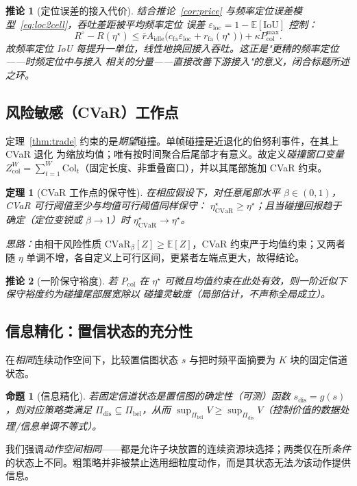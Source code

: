 \documentclass[11pt,a4paper]{article}
\theoremstyle{plain}
\newtheorem{theorem}{定理}
\newtheorem{proposition}{命题}
\newtheorem{corollary}{推论}
\theoremstyle{definition}
\newcommand{\Pcol}{P_{\mathrm{col}}}
\newcommand{\thr}{\eta}
\newcommand{\eloc}{\varepsilon_{\mathrm{loc}}}
\newcommand{\CVaR}{\mathrm{CVaR}}
\newcommand{\E}{\mathbb{E}}
\begin{document}
\begin{corollary}[定位误差的接入代价]
\label{cor:loc}
结合推论~\ref{cor:price} 与频率定位误差模型~\eqref{eq:loc2cell}，吞吐差距被平均频率定位
误差 $\eloc=1-\E[\mathrm{IoU}]$ 控制：
\[
R^\circ-R(\thr^\star)\le \bar r A_{\mathrm{idle}}\big(c_{\mathrm{fa}}\eloc+r_{\mathrm{fa}}(\thr^\star)\big)+\kappa\Pcol^{\max}.
\]
故频率定位 IoU 每提升一单位，线性地换回接入吞吐。这正是"更精的频率定位——时频定位中与接入
相关的分量——直接改善下游接入"的意义，闭合标题所述之环。
\end{corollary}

\subsection{风险敏感（CVaR）工作点}
定理~\ref{thm:trade} 约束的是\emph{期望}碰撞。单帧碰撞是近退化的伯努利事件，在其上 CVaR 退化
为缩放均值；唯有按时间聚合后尾部才有意义。故定义\emph{碰撞窗口变量}
$Z_{\mathrm{col}}^W=\sum_{t=1}^W \mathrm{Col}_t$（固定长度、非重叠窗口），并以其尾部施加 CVaR
约束。

\begin{theorem}[CVaR 工作点的保守性]
\label{thm:cvar}
在相应假设下，对任意尾部水平 $\beta\in(0,1)$，CVaR 可行阈值至少与均值可行阈值同样保守：
$\thr^\star_{\CVaR}\ge\thr^\star$；且当碰撞回报趋于确定（定位变锐或 $\beta\to1$）时
$\thr^\star_{\CVaR}\to\thr^\star$。
\end{theorem}
\noindent\emph{思路：}由相干风险性质 $\CVaR_\beta[Z]\ge\E[Z]$，CVaR 约束严于均值约束；又两者
随 $\thr$ 单调不增，各自定义上可行区间，更紧者左端点更大，故得结论。

\begin{corollary}[一阶保守裕度]
\label{cor:cvar}
若 $\Pcol$ 在 $\thr^\star$ 可微且均值约束在此处有效，则一阶近似下保守裕度约为碰撞尾部展宽除以
碰撞灵敏度（局部估计，不声称全局成立）。
\end{corollary}

\subsection{信息精化：置信状态的充分性}
在\emph{相同}连续动作空间下，比较置信图状态 $s$ 与把时频平面摘要为 $K$ 块的固定信道状态。

\begin{proposition}[信息精化]
\label{prop:suff}
若固定信道状态是置信图的确定性（可测）函数 $s_{\mathrm{dis}}=g(s)$，则对应策略类满足
$\Pi_{\mathrm{dis}}\subseteq\Pi_{\mathrm{bel}}$，从而
$\sup_{\Pi_{\mathrm{bel}}}V\ge\sup_{\Pi_{\mathrm{dis}}}V$（控制价值的数据处理/信息单调不等式）。
\end{proposition}
\noindent 我们强调\emph{动作空间相同}——都是允许子块放置的连续资源块选择；两类仅在所\emph{条件}
的状态上不同。粗策略并非被禁止选用细粒度动作，而是其状态无法\emph{为}该动作提供信息。
\end{document}
